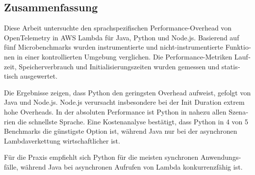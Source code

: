 \begin{otherlanguage}{ngerman}
	\chapter*{Zusammenfassung}
Diese Arbeit untersuchte den sprachspezifischen Performance-Overhead von OpenTelemetry in AWS 
Lambda für Java, Python und Node.js. 
Basierend auf fünf Microbenchmarks wurden instrumentierte und nicht-instrumentierte Funktionen in 
einer kontrollierten Umgebung verglichen. 
Die Performance-Metriken Laufzeit, Speicherverbrauch und Initialisierungszeiten wurden gemessen und 
statistisch ausgewertet.

Die Ergebnisse zeigen, dass Python den geringsten Overhead aufweist, 
gefolgt von Java und Node.js. Node.js verursacht insbesondere bei der Init Duration extrem hohe Overheads. 
In der absoluten Performance ist Python in nahezu allen Szenarien die schnellste Sprache. 
Eine Kostenanalyse bestätigt, dass Python in 4 von 5 Benchmarks die günstigste Option ist, 
während Java nur bei der asynchronen Lambdaverkettung wirtschaftlicher ist.

Für die Praxis empfiehlt sich Python für die meisten synchronen Anwendungsfälle, während Java bei 
asynchronen Aufrufen von Lambda konkurrenzfähig ist.

\end{otherlanguage}
